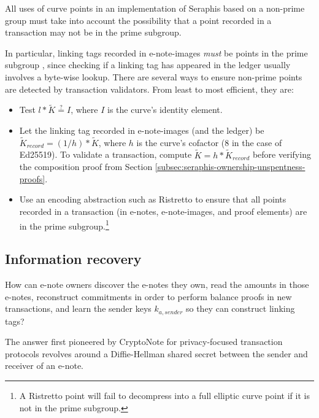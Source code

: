 All uses of curve points in an implementation of Seraphis based on a non-prime group must take into account the possibility that a point recorded in a transaction may not be in the prime subgroup.

In particular, linking tags recorded in e-note-images {\em must} be points in the prime subgroup \cite{key-image-bug}, since checking if a linking tag has appeared in the ledger usually involves a byte-wise lookup. There are several ways to ensure non-prime points are detected by transaction validators. From least to most efficient, they are:

\begin{itemize}
    \item Test $l*\tilde{K} \stackrel{?}{=} I$, where $I$ is the curve's identity element.

    \item Let the linking tag recorded in e-note-images (and the ledger) be $\tilde{K}_{record} = (1/h)*\tilde{K}$, where $h$ is the curve's cofactor (8 in the case of Ed25519). To validate a transaction, compute $\tilde{K} = h*\tilde{K}_{record}$ before verifying the composition proof from Section \ref{subsec:seraphis-ownership-unspentness-proofs}.

    \item Use an encoding abstraction such as Ristretto \cite{ristretto} to ensure that all points recorded in a transaction (in e-notes, e-note-images, and proof elements) are in the prime subgroup.\footnote{A Ristretto point will fail to decompress into a full elliptic curve point if it is not in the prime subgroup.}
\end{itemize}


\subsection{Information recovery}
\label{subsec:implementers-information-recovery}

How can e-note owners discover the e-notes they own, read the amounts in those e-notes, reconstruct commitments in order to perform balance proofs in new transactions, and learn the sender keys $k_{a,sender}$ so they can construct linking tags?

The answer first pioneered by CryptoNote \cite{cryptoNoteWhitePaper} for privacy-focused transaction protocols revolves around a Diffie-Hellman shared secret between the sender and receiver of an e-note.

